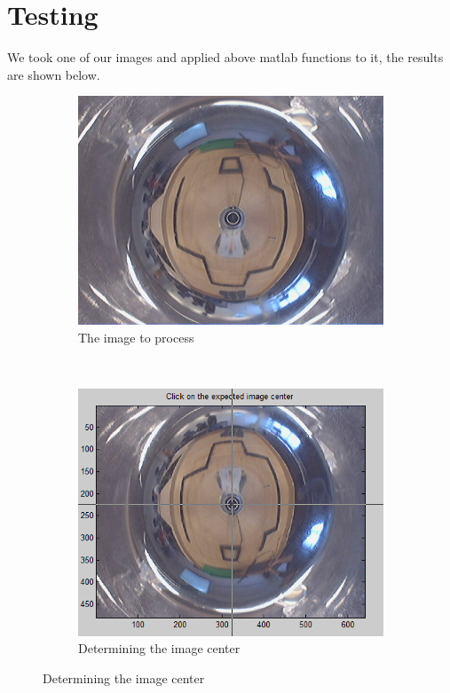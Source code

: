 \documentclass[12pt]{article}
\begin{document}
\section{Testing}
We took one of our images and applied above matlab functions to it, the results are shown below.
\begin{figure}[h!]
	\centering
	\begin{subfigure}[b]{0.4\textwidth}
		\includegraphics[width=\textwidth]{c.jpg}
		\caption{The image to process}
	\end{subfigure}
	~
	\begin{subfigure}[b]{0.4\textwidth}
		\includegraphics[width=\textwidth]{center.png}
		\caption{Determining the image center}
	\end{subfigure}


\end{figure}
\end{document}
